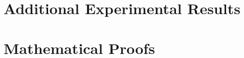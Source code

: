 \documentclass[11pt,a4paper]{article}
\begin{document}
\appendix
\section{Additional Experimental Results}
\label{app:additional_results}


\section{Mathematical Proofs}
\label{app:proofs}

\end{document}
